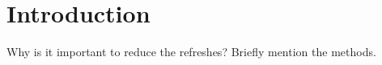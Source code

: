 \section{Introduction}
\label{sec:int}
Why is it important to reduce the refreshes?
Briefly mention the methods.